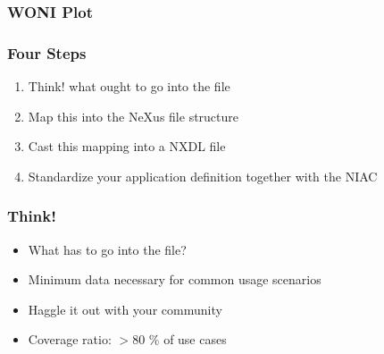 \documentclass{beamer}
\begin{document}
\begin{frame} \frametitle{WONI Plot}
\begin{figure}[!ht]
\end{figure}
\end{frame}

\begin{frame}
\frametitle{Four Steps}
\begin{enumerate}
\item {\color{blue} Think!} what ought to go into the file
\item {\color{blue}Map }this into the NeXus file structure
\item {\color{blue} Cast} this mapping into a NXDL file
\item {\color{blue} Standardize} your application definition together with the NIAC
\end{enumerate}
\end{frame}

\begin{frame}
\frametitle{Think!}
\begin{itemize}
\item What has to go into the file?
\item Minimum data necessary for common usage scenarios
\item Haggle it out with your community
\item Coverage ratio: $> 80$ \% of use cases
\end{itemize}
\end{frame}
\end{document}
